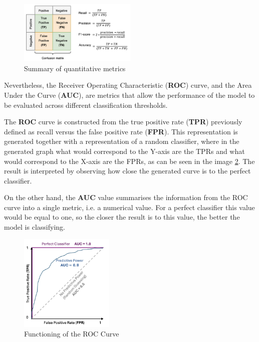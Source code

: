 \begin{figure}[h]
\centering
    \includegraphics[width=0.5\textwidth]{figures/quantitative-metrics.png}
\caption{Summary of quantitative metrics}
\label{fig:quantitative}
\end{figure}

Nevertheless, the Receiver Operating Characteristic (\textbf{ROC}) curve, and the Area Under the Curve (\textbf{AUC}), are metrics that allow the performance of the model to be evaluated across different classification thresholds. 

The \textbf{ROC} curve is constructed from the true positive rate (\textbf{TPR}) previously defined as recall versus the false positive rate (\textbf{FPR}). This representation is generated together with a representation of a random classifier, where in the generated graph what would correspond to the Y-axis are the TPRs and what would correspond to the X-axis are the FPRs, as can be seen in the image \ref{fig:ROC}. The result is interpreted by observing how close the generated curve is to the perfect classifier. 

On the other hand, the \textbf{AUC} value summarises the information from the ROC curve into a single metric, i.e. a numerical value. For a perfect classifier this value would be equal to one, so the closer the result is to this value, the better the model is classifying. 

\begin{figure}[h]
\centering
    \includegraphics[width=0.4\textwidth]{figures/ROC-curve.png}
\caption{Functioning of the ROC Curve}
\label{fig:ROC}
\end{figure}


